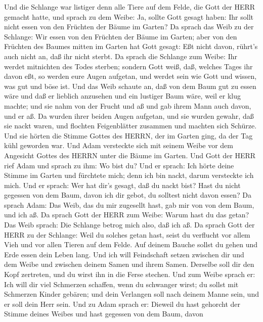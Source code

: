  Und die Schlange war listiger denn alle Tiere auf dem
Felde, die Gott der HERR gemacht hatte, und sprach zu dem Weibe: Ja,
sollte Gott gesagt haben: Ihr sollt nicht essen von den Früchten der
Bäume im Garten?  Da sprach das Weib zu der Schlange: Wir
essen von den Früchten der Bäume im Garten;  aber von den
Früchten des Baumes mitten im Garten hat Gott gesagt: Eßt nicht davon,
rührt's auch nicht an, daß ihr nicht sterbt.  Da sprach die
Schlange zum Weibe: Ihr werdet mitnichten des Todes sterben;
 sondern Gott weiß, daß, welches Tages ihr davon eßt, so
werden eure Augen aufgetan, und werdet sein wie Gott und wissen, was gut
und böse ist.  Und das Weib schaute an, daß von dem Baum gut
zu essen wäre und daß er lieblich anzusehen und ein lustiger Baum wäre,
weil er klug machte; und sie nahm von der Frucht und aß und gab ihrem
Mann auch davon, und er aß.  Da wurden ihrer beiden Augen
aufgetan, und sie wurden gewahr, daß sie nackt waren, und flochten
Feigenblätter zusammen und machten sich Schürze.  Und sie
hörten die Stimme Gottes des HERRN, der im Garten ging, da der Tag kühl
geworden war. Und Adam versteckte sich mit seinem Weibe vor dem
Angesicht Gottes des HERRN unter die Bäume im Garten.  Und
Gott der HERR rief Adam und sprach zu ihm: Wo bist du?  Und
er sprach: Ich hörte deine Stimme im Garten und fürchtete mich; denn ich
bin nackt, darum versteckte ich mich.  Und er sprach: Wer
hat dir's gesagt, daß du nackt bist? Hast du nicht gegessen von dem
Baum, davon ich dir gebot, du solltest nicht davon essen? 
Da sprach Adam: Das Weib, das du mir zugesellt hast, gab mir von von dem
Baum, und ich aß.  Da sprach Gott der HERR zum Weibe: Warum
hast du das getan? Das Weib sprach: Die Schlange betrog mich also, daß
ich aß.  Da sprach Gott der HERR zu der Schlange: Weil du
solches getan hast, seist du verflucht vor allem Vieh und vor allen
Tieren auf dem Felde. Auf deinem Bauche sollst du gehen und Erde essen
dein Leben lang.  Und ich will Feindschaft setzen zwischen
dir und dem Weibe und zwischen deinem Samen und ihrem Samen. Derselbe
soll dir den Kopf zertreten, und du wirst ihn in die Ferse stechen.
 Und zum Weibe sprach er: Ich will dir viel Schmerzen
schaffen, wenn du schwanger wirst; du sollst mit Schmerzen Kinder
gebären; und dein Verlangen soll nach deinem Manne sein, und er soll
dein Herr sein.  Und zu Adam sprach er: Dieweil du hast
gehorcht der Stimme deines Weibes und hast gegessen von dem Baum, davon
